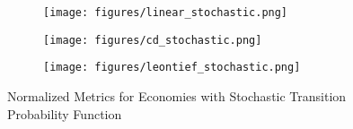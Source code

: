 

\begin{figure}
    \begin{subfigure}{\textwidth}
        \centering
        \texttt{[image: figures/linear\_stochastic.png]}
        \label{fig:linear_stochastic}
    \end{subfigure}
    
    
    \begin{subfigure}{\textwidth}
        \centering
        \texttt{[image: figures/cd\_stochastic.png]}
        \label{fig:cd_stochastic}
    \end{subfigure}
    
    
    \begin{subfigure}{\textwidth}
        \centering
        \texttt{[image: figures/leontief\_stochastic.png]}
        \label{fig:leontief_stochastic}
    \end{subfigure}

    \caption{Normalized Metrics for Economies with Stochastic Transition Probability Function}
    \label{fig:stochastic}
\end{figure}



